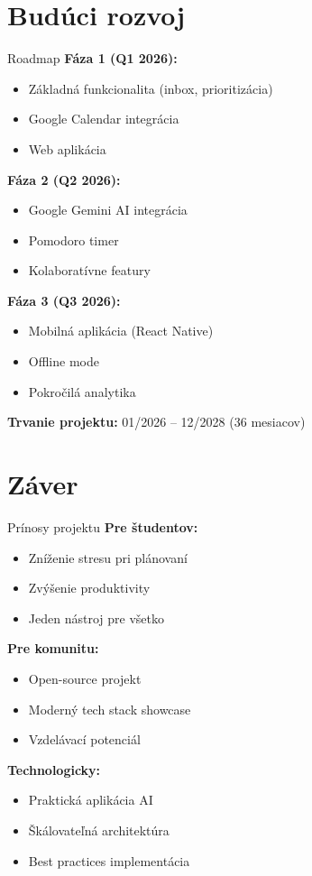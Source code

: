 \documentclass{beamer}
\begin{document}
\section{Budúci rozvoj}

\begin{frame}{Roadmap}
\textbf{Fáza 1 (Q1 2026):}
\begin{itemize}
\item Základná funkcionalita (inbox, prioritizácia)
\item Google Calendar integrácia
\item Web aplikácia
\end{itemize}

\textbf{Fáza 2 (Q2 2026):}
\begin{itemize}
\item Google Gemini AI integrácia
\item Pomodoro timer
\item Kolaboratívne featury
\end{itemize}

\textbf{Fáza 3 (Q3 2026):}
\begin{itemize}
\item Mobilná aplikácia (React Native)
\item Offline mode
\item Pokročilá analytika
\end{itemize}

\vspace{0.3cm}
\small \textbf{Trvanie projektu:} 01/2026 -- 12/2028 (36 mesiacov)
\end{frame}

\section{Záver}

\begin{frame}{Prínosy projektu}
\textbf{Pre študentov:}
\begin{itemize}
\item Zníženie stresu pri plánovaní
\item Zvýšenie produktivity
\item Jeden nástroj pre všetko
\end{itemize}

\vspace{0.5cm}
\textbf{Pre komunitu:}
\begin{itemize}
\item Open-source projekt
\item Moderný tech stack showcase
\item Vzdelávací potenciál
\end{itemize}

\vspace{0.5cm}
\textbf{Technologicky:}
\begin{itemize}
\item Praktická aplikácia AI
\item Škálovateľná architektúra
\item Best practices implementácia
\end{itemize}
\end{frame}
\end{document}
